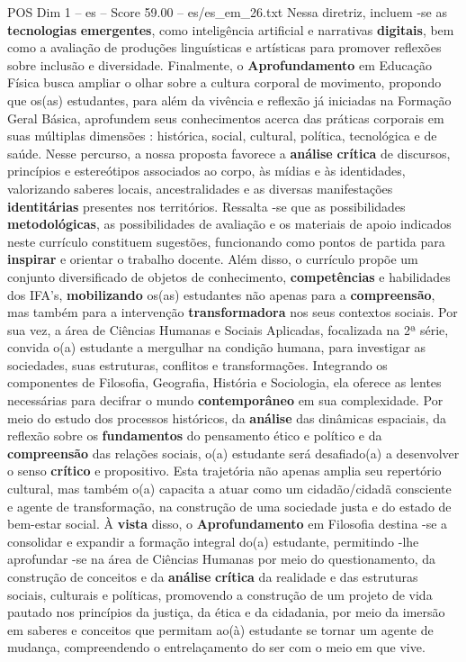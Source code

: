 \begin{textsample}{POS Dim 1 – es – Score 59.00 – es/es\_em\_26.txt}
Nessa diretriz, incluem -se as \textbf{tecnologias} \textbf{emergentes}, como inteligência artificial e narrativas \textbf{digitais}, bem como a avaliação de produções linguísticas e artísticas para promover reflexões sobre inclusão e diversidade.
Finalmente, o \textbf{Aprofundamento} em Educação Física busca ampliar o olhar sobre a cultura corporal de movimento, propondo que os(as) estudantes, para além da vivência e reflexão já iniciadas na Formação Geral Básica, aprofundem seus conhecimentos acerca das práticas corporais em suas múltiplas dimensões : histórica, social, cultural, política, tecnológica e de saúde.
Nesse percurso, a nossa proposta favorece a \textbf{análise} \textbf{crítica} de discursos, princípios e estereótipos associados ao corpo, às mídias e às identidades, valorizando saberes locais, ancestralidades e as diversas manifestações \textbf{identitárias} presentes nos territórios.
Ressalta -se que as possibilidades \textbf{metodológicas}, as possibilidades de avaliação e os materiais de apoio indicados neste currículo constituem sugestões, funcionando como pontos de partida para \textbf{inspirar} e orientar o trabalho docente.
Além disso, o currículo propõe um conjunto diversificado de objetos de conhecimento, \textbf{competências} e habilidades dos IFA’s, \textbf{mobilizando} os(as) estudantes não apenas para a \textbf{compreensão}, mas também para a intervenção \textbf{transformadora} nos seus contextos sociais.
Por sua vez, a área de Ciências Humanas e Sociais Aplicadas, focalizada na 2ª série, convida o(a) estudante a mergulhar na condição humana, para investigar as sociedades, suas estruturas, conflitos e transformações.
Integrando os componentes de Filosofia, Geografia, História e Sociologia, ela oferece as lentes necessárias para decifrar o mundo \textbf{contemporâneo} em sua complexidade.
Por meio do estudo dos processos históricos, da \textbf{análise} das dinâmicas espaciais, da reflexão sobre os \textbf{fundamentos} do pensamento ético e político e da \textbf{compreensão} das relações sociais, o(a) estudante será desafiado(a) a desenvolver o senso \textbf{crítico} e propositivo.
Esta trajetória não apenas amplia seu repertório cultural, mas também o(a) capacita a atuar como um cidadão/cidadã consciente e agente de transformação, na construção de uma sociedade justa e do estado de bem-estar social.
À \textbf{vista} disso, o \textbf{Aprofundamento} em Filosofia destina -se a consolidar e expandir a formação integral do(a) estudante, permitindo -lhe aprofundar -se na área de Ciências Humanas por meio do questionamento, da construção de conceitos e da \textbf{análise} \textbf{crítica} da realidade e das estruturas sociais, culturais e políticas, promovendo a construção de um projeto de vida pautado nos princípios da justiça, da ética e da cidadania, por meio da imersão em saberes e conceitos que permitam ao(à) estudante se tornar um agente de mudança, compreendendo o entrelaçamento do ser com o meio em que vive.

\end{textsample}
